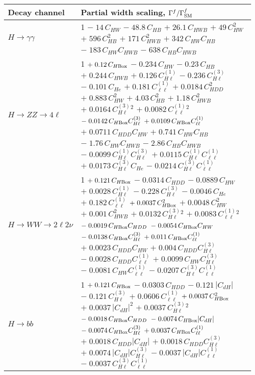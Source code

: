 \begin{tabular}{l|p{}}
    Decay channel & Partial width scaling, $\Gamma^f/\Gamma^f_{\rm{SM}}$ \\ \hline
    $H \rightarrow \gamma\gamma$ & 1 $-\;14\,C_{HW}$ $-\;48.8\,C_{HB}$ $+\;26.1\,C_{HWB}$ $+\;49\,C_{HW}^{2}$ $+\;596\,C_{HB}^{2}$ $+\;171\,C_{HWB}^{2}$ $+\;342\,C_{HW}C_{HB}$ $-\;183\,C_{HW}C_{HWB}$ $-\;638\,C_{HB}C_{HWB}$ \\
    $H \rightarrow ZZ \rightarrow 4\ell$ & 1 $+\;0.12\,C_{H\rm{Box}}$ $-\;0.234\,C_{HW}$ $-\;0.23\,C_{HB}$ $+\;0.244\,C_{HWB}$ $+\;0.126\,C^{(1)}_{H\ell}$ $-\;0.236\,C^{(3)}_{H\ell}$ $-\;0.101\,C_{He}$ $+\;0.181\,C^{(1)}_{\ell\ell}$ $+\;0.0184\,C_{HDD}^{2}$ $+\;0.883\,C_{HW}^{2}$ $+\;4.03\,C_{HB}^{2}$ $+\;1.18\,C_{HWB}^{2}$ $+\;0.0164\,C^{(3)}_{H\ell}^{2}$ $+\;0.0082\,C^{(1)}_{\ell\ell}^{2}$ $-\;0.0142\,C_{H\rm{Box}}C^{(3)}_{H\ell}$ $+\;0.0109\,C_{H\rm{Box}}C^{(1)}_{\ell\ell}$ $+\;0.0711\,C_{HDD}C_{HW}$ $+\;0.741\,C_{HW}C_{HB}$ $-\;1.76\,C_{HW}C_{HWB}$ $-\;2.86\,C_{HB}C_{HWB}$ $-\;0.0099\,C^{(1)}_{H\ell}C^{(3)}_{H\ell}$ $+\;0.0115\,C^{(1)}_{H\ell}C^{(1)}_{\ell\ell}$ $+\;0.0173\,C^{(3)}_{H\ell}C_{He}$ $-\;0.0214\,C^{(3)}_{H\ell}C^{(1)}_{\ell\ell}$ \\
    $H \rightarrow WW \rightarrow 2\ell2\nu$ & 1 $+\;0.121\,C_{H\rm{Box}}$ $-\;0.0314\,C_{HDD}$ $-\;0.0889\,C_{HW}$ $+\;0.0028\,C^{(1)}_{H\ell}$ $-\;0.228\,C^{(3)}_{H\ell}$ $-\;0.0046\,C_{He}$ $+\;0.182\,C^{(1)}_{\ell\ell}$ $+\;0.0037\,C_{H\rm{Box}}^{2}$ $+\;0.0048\,C_{HW}^{2}$ $+\;0.001\,C_{HWB}^{2}$ $+\;0.0132\,C^{(3)}_{H\ell}^{2}$ $+\;0.0083\,C^{(1)}_{\ell\ell}^{2}$ $-\;0.0019\,C_{H\rm{Box}}C_{HDD}$ $-\;0.0054\,C_{H\rm{Box}}C_{HW}$ $-\;0.0138\,C_{H\rm{Box}}C^{(3)}_{H\ell}$ $+\;0.011\,C_{H\rm{Box}}C^{(1)}_{\ell\ell}$ $+\;0.0023\,C_{HDD}C_{HW}$ $+\;0.004\,C_{HDD}C^{(3)}_{H\ell}$ $-\;0.0028\,C_{HDD}C^{(1)}_{\ell\ell}$ $+\;0.0099\,C_{HW}C^{(3)}_{H\ell}$ $-\;0.0081\,C_{HW}C^{(1)}_{\ell\ell}$ $-\;0.0207\,C^{(3)}_{H\ell}C^{(1)}_{\ell\ell}$ \\
    $H \rightarrow bb$ & 1 $+\;0.121\,C_{H\rm{Box}}$ $-\;0.0303\,C_{HDD}$ $-\;0.121\,|C_{dH}|$ $-\;0.121\,C^{(3)}_{H\ell}$ $+\;0.0606\,C^{(1)}_{\ell\ell}$ $+\;0.0037\,C_{H\rm{Box}}^{2}$ $+\;0.0037\,|C_{dH}|^{2}$ $+\;0.0037\,C^{(3)}_{H\ell}^{2}$ $-\;0.0018\,C_{H\rm{Box}}C_{HDD}$ $-\;0.0074\,C_{H\rm{Box}}|C_{dH}|$ $-\;0.0074\,C_{H\rm{Box}}C^{(3)}_{H\ell}$ $+\;0.0037\,C_{H\rm{Box}}C^{(1)}_{\ell\ell}$ $+\;0.0018\,C_{HDD}|C_{dH}|$ $+\;0.0018\,C_{HDD}C^{(3)}_{H\ell}$ $+\;0.0074\,|C_{dH}|C^{(3)}_{H\ell}$ $-\;0.0037\,|C_{dH}|C^{(1)}_{\ell\ell}$ $-\;0.0037\,C^{(3)}_{H\ell}C^{(1)}_{\ell\ell}$ \\

\end{tabular}
